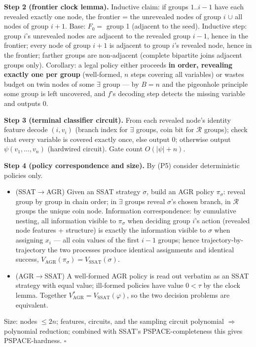 \documentclass{article}
\providecommand{\qed}{\hfill$\square$}
\begin{document}
\textbf{Step 2 (frontier clock lemma).} Inductive claim: if groups $1..i-1$ have each revealed exactly one node, the frontier = the unrevealed nodes of group $i$ $\cup$ all nodes of group $i{+}1$. Base: $F_0=$ group 1 (adjacent to the seed). Inductive step: group $i$'s unrevealed nodes are adjacent to the revealed group $i-1$, hence in the frontier; every node of group $i{+}1$ is adjacent to group $i$'s revealed node, hence in the frontier; farther groups are non-adjacent (complete bipartite joins adjacent groups only). Corollary: a legal policy either proceeds \textbf{in order, revealing exactly one per group} (well-formed, $n$ steps covering all variables) or wastes budget on twin nodes of some $\exists$ group --- by $B=n$ and the pigeonhole principle some group is left uncovered, and $f$'s decoding step detects the missing variable and outputs 0.

\textbf{Step 3 (terminal classifier circuit).} From each revealed node's identity feature decode $(i,v_i)$ (branch index for $\exists$ groups, coin bit for $\mathcal R$ groups); check that every variable is covered exactly once, else output 0; otherwise output $\psi(v_1,\dots,v_n)$ (hardwired circuit). Gate count $O(|\psi|+n)$.

\textbf{Step 4 (policy correspondence and size).} By (P5) consider deterministic policies only.
\begin{itemize}
\item (SSAT$\to$AGR) Given an SSAT strategy $\sigma$, build an AGR policy $\pi_\sigma$: reveal group by group in chain order; in $\exists$ groups reveal $\sigma$'s chosen branch, in $\mathcal R$ groups the unique coin node. Information correspondence: by cumulative nesting, all information visible to $\pi_\sigma$ when deciding group $i$'s action (revealed node features + structure) is exactly the information visible to $\sigma$ when assigning $x_i$ --- all coin values of the first $i-1$ groups; hence trajectory-by-trajectory the two processes produce identical assignments and identical success, $V_{\text{AGR}}(\pi_\sigma)=V_{\text{SSAT}}(\sigma)$.
\item (AGR$\to$SSAT) A well-formed AGR policy is read out verbatim as an SSAT strategy with equal value; ill-formed policies have value $0<\tau$ by the clock lemma. Together $V^*_{\text{AGR}}=V_{\text{SSAT}}(\varphi)$, so the two decision problems are equivalent.
\end{itemize}

Size: nodes $\le 2n$; features, circuits, and the sampling circuit polynomial $\Rightarrow$ polynomial reduction; combined with SSAT's PSPACE-completeness this gives PSPACE-hardness. \qed{}
\end{document}
